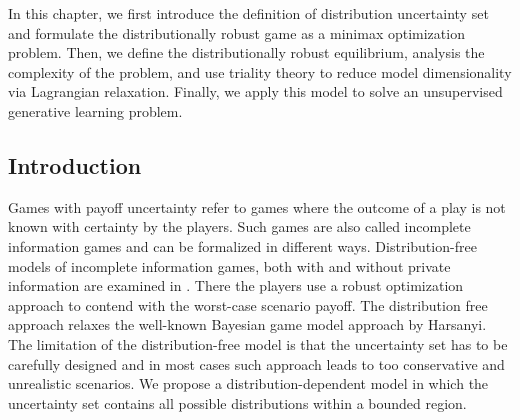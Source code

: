 \documentclass{article}
\begin{document}
In this chapter, we first introduce the definition of distribution uncertainty set and formulate the distributionally robust game as a minimax optimization problem. Then, we define the distributionally robust equilibrium, analysis the complexity of the problem, and use triality theory to reduce model dimensionality via Lagrangian relaxation. Finally, we apply this model to solve an unsupervised generative learning problem.


\subsection{Introduction}
Games with payoff uncertainty refer to games where the outcome of a play is not known with certainty by the players. Such games are also called incomplete information games and can be formalized in different ways. Distribution-free models of incomplete information games, both with and without private information are examined in \cite{Aghassi2006,doi:10.1137/080734510}. There the players use a robust optimization approach to contend with the worst-case scenario payoff. The distribution free approach relaxes the well-known Bayesian game model approach by Harsanyi. The limitation of the distribution-free model is that the uncertainty set has to be carefully designed and in most cases such approach leads to too conservative and unrealistic scenarios. {\color{blue} We propose a distribution-dependent model in which the uncertainty set contains all possible distributions within a bounded region.}
\end{document}
